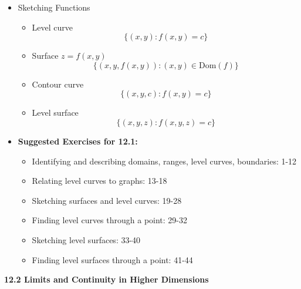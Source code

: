 \documentclass[12pt]{article}
\newcommand{\<}{\left<}
\renewcommand{\>}{\right>}
\begin{document}
\begin{itemize}
    \item Sketching Functions
  
      \begin{itemize}
        \item Level curve
          \[\{(x,y):f(x,y)=c\}\]
        \item Surface $z=f(x,y)$
          \[\{(x,y,f(x,y)): (x,y)\in \textrm{Dom}(f)\}\]
        \item Contour curve 
          \[\{(x,y,c): f(x,y)=c\}\]
        \item Level surface
          \[\{(x,y,z):f(x,y,z)=c\}\]
      \end{itemize}
  
  \item \textbf{ Suggested Exercises for 12.1:}
  
    \begin{itemize}
    \item Identifying and describing domains, ranges, level curves, boundaries: 1-12
    \item Relating level curves to graphs: 13-18
    \item Sketching surfaces and level curves: 19-28
    \item Finding level curves through a point: 29-32
    \item Sketching level surfaces: 33-40
    \item Finding level surfaces through a point: 41-44
    \end{itemize}
    
  \end{itemize}
  
  \newpage
  
  \centerline{\bf 12.2 Limits and Continuity in Higher Dimensions}
  
\end{document}

